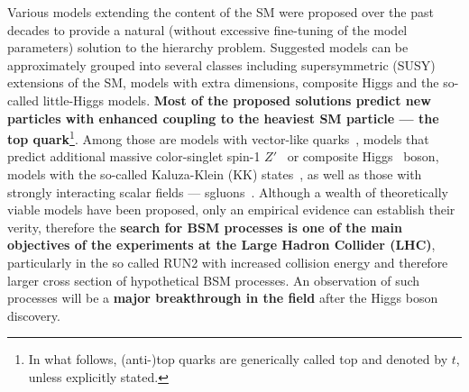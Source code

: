 Various models extending the content of the SM were proposed over the past decades to provide a natural (without excessive fine-tuning of the model parameters) solution to the hierarchy problem. Suggested models can be approximately grouped into several classes including supersymmetric (SUSY) extensions of the SM, models with extra dimensions, composite Higgs and the so-called little-Higgs models. \textbf{Most of the proposed solutions predict new particles with enhanced coupling to the heaviest SM particle --- the top quark}\footnote{In what follows, (anti-)top quarks are generically called top and denoted by $t$, unless explicitly stated.}. Among those are models with vector-like quarks~\cite{Aguilar-Saavedra:2013qpa}, models that predict additional massive color-singlet spin-1 $Z'$~\cite{Langacker:2008yv} or composite Higgs~\cite{Agashe:2004rs} boson, models with the so-called Kaluza-Klein (KK) states~\cite{Agashe:2006hk,Davoudiasl:1999jd}, as well as those with strongly interacting scalar fields --- sgluons~\cite{Plehn:2008ae,GoncalvesNetto:2012nt}. Although a wealth of theoretically viable models have been proposed, only an empirical evidence can establish their verity, therefore the \textbf{search for BSM processes is one of the main objectives of the experiments at the Large Hadron Collider (LHC)}, particularly in the so called RUN2 with increased collision energy and therefore larger cross section of hypothetical BSM processes. An observation of such processes will be a \textbf{major breakthrough in the field} after the Higgs boson discovery.

